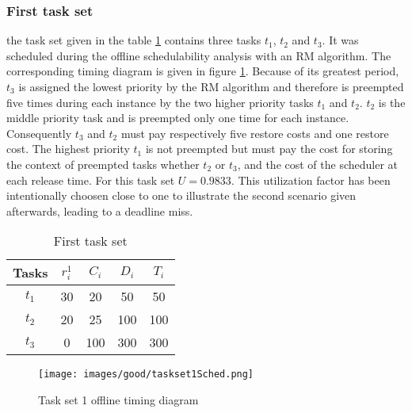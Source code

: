 \documentclass[conference,compsocconf]{IEEEtran}
\begin{document}
\subsubsection{First task set}

the task set given in the table \ref{taskSet1Table} contains three tasks $t_1$, $t_2$ and $t_3$. It was scheduled during the offline schedulability analysis with an RM algorithm. The corresponding timing diagram is given in figure \ref{taskSet1Sched}. Because of its greatest period, $t_3$ is assigned the lowest priority by the RM algorithm and therefore is preempted five times during each instance by the two higher priority tasks $t_1$ and $t_2$. $t_2$ is the middle priority task and is preempted only one time for each instance. Consequently $t_3$ and $t_2$ must
pay respectively five restore costs and one restore cost. The highest priority $t_1$ is not preempted but must pay the cost for storing the context of preempted tasks whether $t_2$ or $t_3$, and the cost of the scheduler at each release time. For this task set $U=0.9833$. This utilization factor has been intentionally choosen close to one to illustrate the second scenario given afterwards, leading to a deadline miss.  



\begin{table}[h]
\caption{First task set}
\label{taskSet1Table}
\begin{center}
\begin{tabular}{|c|c|c|c|c|}
\hline
\textbf{Tasks} & \textbf{$r_i^1$} & \textbf{$C_i$} & \textbf{$D_i$} & \textbf{$T_i$} \\
\hline
$t_1$& 30 & 20 & 50  & 50\\
\hline
$t_2$& 20 & 25 & 100 & 100 \\
\hline
$t_3$& 0  &100 & 300 & 300 \\
\hline
\end{tabular}
\end{center}
\end{table}



\begin{center}
\begin{figure}[h]
  \texttt{[image: images/good/taskset1Sched.png]}
  \caption{ Task set 1 offline timing diagram}
  \label{taskSet1Sched}

    
\end{figure}
\end{center}
\end{document}
